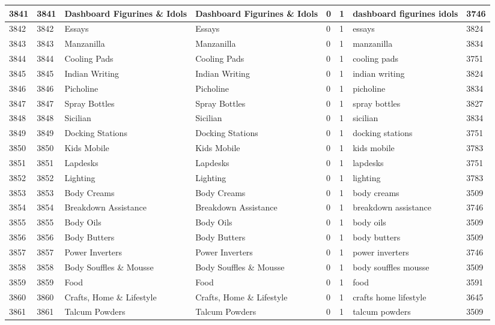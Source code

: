 \begin{longtable}{|l|l|l|l|l|l|l|l|}
3841 & 3841 & Dashboard Figurines \& Idols & Dashboard Figurines \& Idols & 0 & 1 & dashboard figurines idols & 3746 \\ \hline 
3842 & 3842 & Essays & Essays & 0 & 1 & essays & 3824 \\ \hline 
3843 & 3843 & Manzanilla & Manzanilla & 0 & 1 & manzanilla & 3834 \\ \hline 
3844 & 3844 & Cooling Pads & Cooling Pads & 0 & 1 & cooling pads & 3751 \\ \hline 
3845 & 3845 & Indian Writing & Indian Writing & 0 & 1 & indian writing & 3824 \\ \hline 
3846 & 3846 & Picholine & Picholine & 0 & 1 & picholine & 3834 \\ \hline 
3847 & 3847 & Spray Bottles & Spray Bottles & 0 & 1 & spray bottles & 3827 \\ \hline 
3848 & 3848 & Sicilian & Sicilian & 0 & 1 & sicilian & 3834 \\ \hline 
3849 & 3849 & Docking Stations & Docking Stations & 0 & 1 & docking stations & 3751 \\ \hline 
3850 & 3850 & Kids Mobile & Kids Mobile & 0 & 1 & kids mobile & 3783 \\ \hline 
3851 & 3851 & Lapdesks & Lapdesks & 0 & 1 & lapdesks & 3751 \\ \hline 
3852 & 3852 & Lighting & Lighting & 0 & 1 & lighting & 3783 \\ \hline 
3853 & 3853 & Body Creams & Body Creams & 0 & 1 & body creams & 3509 \\ \hline 
3854 & 3854 & Breakdown Assistance & Breakdown Assistance & 0 & 1 & breakdown assistance & 3746 \\ \hline 
3855 & 3855 & Body Oils & Body Oils & 0 & 1 & body oils & 3509 \\ \hline 
3856 & 3856 & Body Butters & Body Butters & 0 & 1 & body butters & 3509 \\ \hline 
3857 & 3857 & Power Inverters & Power Inverters & 0 & 1 & power inverters & 3746 \\ \hline 
3858 & 3858 & Body Souffles \& Mousse & Body Souffles \& Mousse & 0 & 1 & body souffles mousse & 3509 \\ \hline 
3859 & 3859 & Food & Food & 0 & 1 & food & 3591 \\ \hline 
3860 & 3860 & Crafts, Home \& Lifestyle & Crafts, Home \& Lifestyle & 0 & 1 & crafts home lifestyle & 3645 \\ \hline 
3861 & 3861 & Talcum Powders & Talcum Powders & 0 & 1 & talcum powders & 3509 \\ \hline 

\end{longtable}

